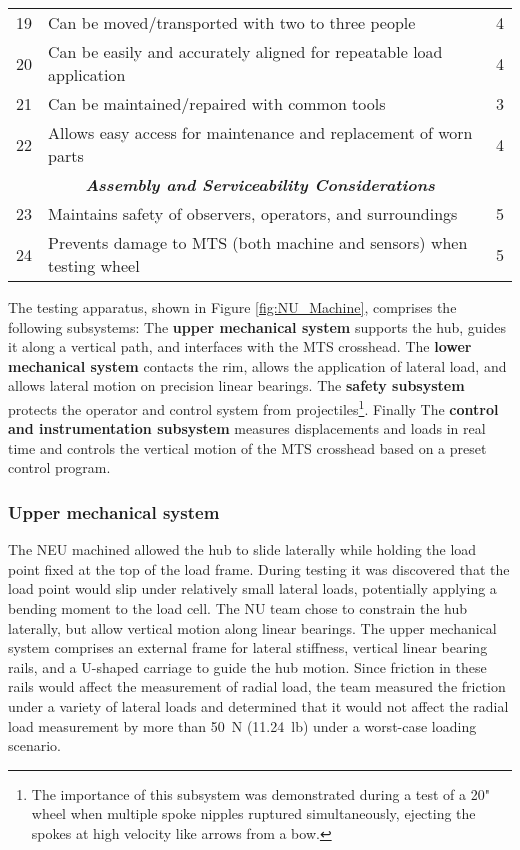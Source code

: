 \documentclass[\rootdir/thesis.tex]{subfiles}
\begin{document}
\begin{table}
\begin{tabularx}{\linewidth}{r|Xc}
\hline
19& Can be moved/transported with two to three people& 4\\
20& Can be easily and accurately aligned for repeatable load application& 4\\
21& Can be maintained/repaired with common tools& 3\\
22& Allows easy access for maintenance and replacement of worn parts& 4\\
\hline
\multicolumn{3}{c}{\emph{\textbf{Assembly and Serviceability Considerations}}}\\
\hline
23& Maintains safety of observers, operators, and surroundings& 5\\
24& Prevents damage to MTS (both machine and sensors) when testing wheel& 5\\
\hline
\end{tabularx}
\end{table}

The testing apparatus, shown in Figure \ref{fig:NU_Machine}, comprises the following subsystems: The \textbf{upper mechanical system} supports the hub, guides it along a vertical path, and interfaces with the MTS crosshead. The \textbf{lower mechanical system} contacts the rim, allows the application of lateral load, and allows lateral motion on precision linear bearings. The \textbf{safety subsystem} protects the operator and control system from projectiles\footnote{The importance of this subsystem was demonstrated during a test of a 20" wheel when multiple spoke nipples ruptured simultaneously, ejecting the spokes at high velocity like arrows from a bow.}. Finally The \textbf{control and instrumentation subsystem} measures displacements and loads in real time and controls the vertical motion of the MTS crosshead based on a preset control program.

\subsubsection*{Upper mechanical system}

The NEU machined allowed the hub to slide laterally while holding the load point fixed at the top of the load frame. During testing it was discovered that the load point would slip under relatively small lateral loads, potentially applying a bending moment to the load cell. The NU team chose to constrain the hub laterally, but allow vertical motion along linear bearings. The upper mechanical system comprises an external frame for lateral stiffness, vertical linear bearing rails, and a U-shaped carriage to guide the hub motion. Since friction in these rails would affect the measurement of radial load, the team measured the friction under a variety of lateral loads and determined that it would not affect the radial load measurement by more than \SI{50}{\newton} (\SI{11.24}{lb}) under a worst-case loading scenario.
\end{document}
